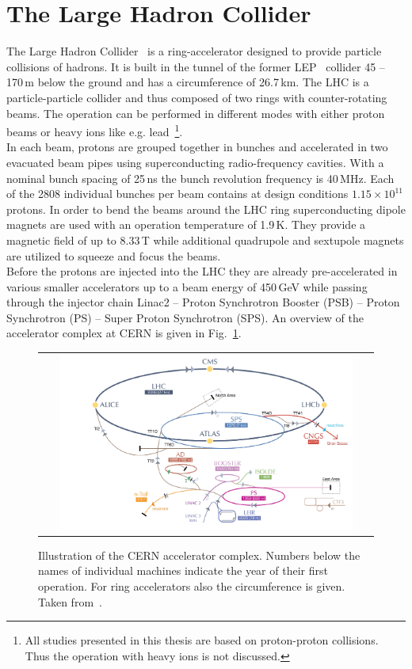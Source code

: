 \section{The Large Hadron Collider}
\label{sec:lhc}
The Large Hadron Collider~\cite{Bruning:782076, 1748-0221-3-08-S08001} is a ring-accelerator designed to provide particle collisions of hadrons. It is built in the tunnel of the former LEP~\cite{LEPdesign} collider 45 -- 170\,m below the ground and has a circumference of 26.7\,km. The LHC is a particle-particle collider and thus composed of two rings with counter-rotating beams. The operation can be performed in different modes with either proton beams or heavy ions like e.g. lead~\footnote{All studies presented in this thesis are based on proton-proton collisions. Thus the operation with heavy ions is not discussed.}. \\
In each beam, protons are grouped together in bunches and accelerated in two evacuated beam pipes using superconducting radio-frequency cavities. With a nominal bunch spacing of 25\,ns the bunch revolution frequency is 40\,MHz. Each of the 2808 individual bunches per beam contains at design conditions $1.15 \times 10^{11}$ protons. In order to bend the beams around the LHC ring superconducting dipole magnets are used with an operation temperature of 1.9\,K. They provide a magnetic field of up to 8.33\,T while additional quadrupole and sextupole magnets are utilized to squeeze and focus the beams.\\  
Before the protons are injected into the LHC they are already pre-accelerated in various smaller accelerators up to a beam energy of 450\,GeV while passing through the injector chain Linac2 -- Proton Synchrotron Booster (PSB) -- Proton Synchrotron (PS) -- Super Proton Synchrotron (SPS). An overview of the accelerator complex at CERN is given in Fig.~\ref{fig:AccComplex}.
\begin{figure}[!tp]
  \centering
  \begin{tabular}{c}
    \includegraphics[width=0.9\textwidth]{figures/AcceleratorComplex.jpg}
  \end{tabular}
  \caption{Illustration of the CERN accelerator complex. Numbers below the names of individual machines indicate the year of their first operation. For ring accelerators also the circumference is given. Taken from~\cite{Christiane:1260465}.}
  \label{fig:AccComplex}
\end{figure}
